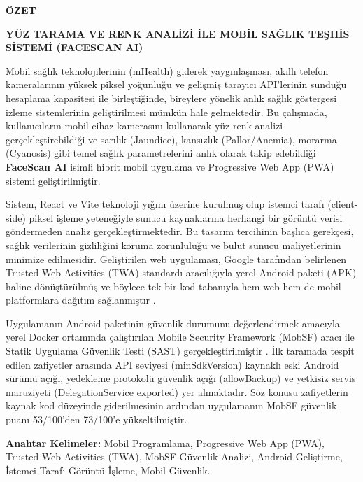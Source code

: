 {}

\begin{center}
\textbf{\large ÖZET}

\textbf{YÜZ TARAMA VE RENK ANALİZİ İLE MOBİL SAĞLIK TEŞHİS SİSTEMİ (FACESCAN AI)}
\end{center}

Mobil sağlık teknolojilerinin (mHealth) giderek yaygınlaşması, akıllı telefon kameralarının yüksek piksel yoğunluğu ve gelişmiş tarayıcı API'lerinin sunduğu hesaplama kapasitesi ile birleştiğinde, bireylere yönelik anlık sağlık göstergesi izleme sistemlerinin geliştirilmesi mümkün hale gelmektedir. Bu çalışmada, kullanıcıların mobil cihaz kamerasını kullanarak yüz renk analizi gerçekleştirebildiği ve sarılık (Jaundice), kansızlık (Pallor/Anemia), morarma (Cyanosis) gibi temel sağlık parametrelerini anlık olarak takip edebildiği \textbf{FaceScan AI} isimli hibrit mobil uygulama ve Progressive Web App (PWA) sistemi geliştirilmiştir.

Sistem, React ve Vite teknoloji yığını üzerine kurulmuş olup istemci tarafı (client-side) piksel işleme yeteneğiyle sunucu kaynaklarına herhangi bir görüntü verisi göndermeden analiz gerçekleştirmektedir. Bu tasarım tercihinin başlıca gerekçesi, sağlık verilerinin gizliliğini koruma zorunluluğu ve bulut sunucu maliyetlerinin minimize edilmesidir. Geliştirilen web uygulaması, Google tarafından belirlenen Trusted Web Activities (TWA) standardı aracılığıyla yerel Android paketi (APK) haline dönüştürülmüş ve böylece tek bir kod tabanıyla hem web hem de mobil platformlara dağıtım sağlanmıştır \cite{google2023twa}.

Uygulamanın Android paketinin güvenlik durumunu değerlendirmek amacıyla yerel Docker ortamında çalıştırılan Mobile Security Framework (MobSF) aracı ile Statik Uygulama Güvenlik Testi (SAST) gerçekleştirilmiştir \cite{mobsf2023docs}. İlk taramada tespit edilen zafiyetler arasında API seviyesi (minSdkVersion) kaynaklı eski Android sürümü açığı, yedekleme protokolü güvenlik açığı (allowBackup) ve yetkisiz servis maruziyeti (DelegationService exported) yer almaktadır. Söz konusu zafiyetlerin kaynak kod düzeyinde giderilmesinin ardından uygulamanın MobSF güvenlik puanı 53/100'den 73/100'e yükseltilmiştir.

\vspace{1.5cm}
\textbf{Anahtar Kelimeler:} Mobil Programlama, Progressive Web App (PWA), Trusted Web Activities (TWA), MobSF Güvenlik Analizi, Android Geliştirme, İstemci Tarafı Görüntü İşleme, Mobil Güvenlik.

\pagebreak{}

